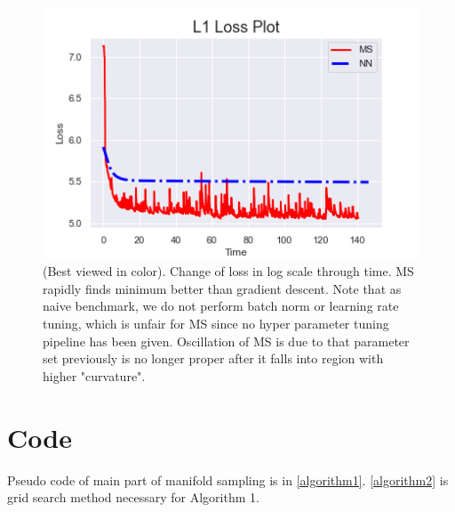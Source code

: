 \documentclass[10pt, oneside]{article}
\begin{document}
  
  \begin{figure}[H]
\centering
  \includegraphics[width=0.8\linewidth]{loss.png}
   \caption{(Best viewed in color). Change of loss in log scale through time. MS rapidly finds minimum better than gradient descent. Note that as naive benchmark, we do not perform batch norm or learning rate tuning, which is unfair for MS since no hyper parameter tuning pipeline has been given. Oscillation of MS is due to that parameter set previously is no longer proper after it falls into region with higher "curvature". }
\label{fig:loss}
\end{figure}






\newpage
\appendix

 \section{Code}
 \label{ap1}
Pseudo code of main part of manifold sampling is in \ref{algorithm1}. \ref{algorithm2} is grid search method necessary for Algorithm 1. 
\end{document}
